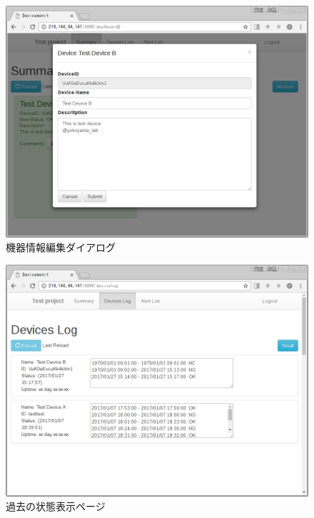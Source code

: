 \begin{figure}[htbp]
\includegraphics[width=16cm]{images/screenshot_mod.png}
\caption{機器情報編集ダイアログ}
\label{fig:ss_mod}
\end{figure}

\begin{figure}[htbp]
\includegraphics[width=16cm]{images/screenshot_logs.png}
\caption{過去の状態表示ページ}
\label{fig:ss_logs}
\end{figure}
